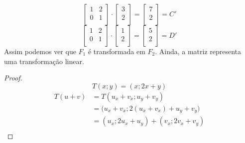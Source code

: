 \documentclass[english,ngerman,parskip=half]{scrartcl}
\begin{document}
\begin{enumerate}
\begin{enumerate}
            \begin{equation}
                \begin{bmatrix}
                1 & 2 \\
                0 & 1 \\
                \end{bmatrix}
                \cdot
                \begin{bmatrix}
                3 \\
                2 \\
                \end{bmatrix}
                =
                \begin{bmatrix}
                7 \\
                2 \\
                \end{bmatrix}
                = C'
            \end{equation}
            \begin{equation}
                \begin{bmatrix}
                1 & 2 \\
                0 & 1 \\
                \end{bmatrix}
                \cdot
                \begin{bmatrix}
                1 \\
                2 \\
                \end{bmatrix}
                =
                \begin{bmatrix}
                5 \\
                2 \\
                \end{bmatrix}
                = D'
            \end{equation}
            Assim podemos ver que $F_1$ é transformada em $F_2$. Ainda, a matriz representa uma transformação linear.
            \begin{proof}
            $$T(x ; y) = (x ; 2x + y)$$
            \begin{equation}
                \begin{split}
                    T( u + v) &= T( u_x + v_x ; u_y + v_y) \\
                    &= \big( u_x + v_x ; 2(u_x + v_x) + u_y + v_y \big) \\
                    &= (u_x ; 2u_x + u_y) + (v_x ; 2v_x + v_y) \\

\end{split}
\end{equation}
\end{proof}
\end{enumerate}
\end{enumerate}
\end{document}
